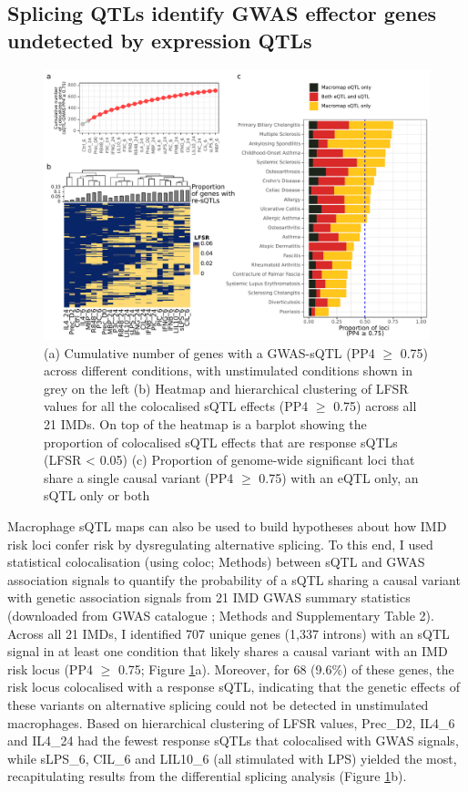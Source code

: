 \subsection{Splicing QTLs identify GWAS effector genes undetected by expression QTLs}
\begin{figure}[H]
  \centering
  \includegraphics[width=\textwidth]{coloc_sqtl}
  \caption{(a) Cumulative number of genes with a GWAS-sQTL (PP4 $\geq$ 0.75) across different conditions, with unstimulated conditions shown in grey on the left (b) Heatmap and hierarchical clustering of LFSR values for all the colocalised sQTL effects (PP4 $\geq$ 0.75) across all 21 IMDs. On top of the heatmap is a barplot showing the proportion of colocalised sQTL effects that are response sQTLs (LFSR < 0.05) (c) Proportion of genome-wide significant loci that share a single causal variant (PP4 $\geq$ 0.75) with an eQTL only, an sQTL only or both }
  \label{fig:coloc}   
\end{figure}
Macrophage sQTL maps can also be used to build hypotheses about how IMD risk loci confer risk by dysregulating alternative splicing. To this end, I used statistical colocalisation (using coloc; Methods) between sQTL and GWAS association signals to quantify the probability of a sQTL sharing a causal variant with genetic association signals from 21 IMD GWAS summary statistics (downloaded from GWAS catalogue \cite{Buniello2019-wb}; Methods and Supplementary Table 2). \\

Across all 21 IMDs, I identified 707 unique genes (1,337 introns) with an sQTL signal in at least one condition that likely shares a causal variant with an IMD risk locus (PP4 $\geq$ 0.75; Figure \ref{fig:coloc}a). Moreover, for 68 (9.6\%) of these genes, the risk locus colocalised with a response sQTL, indicating that the genetic effects of these variants on alternative splicing could not be detected in unstimulated macrophages. Based on hierarchical clustering of LFSR values, Prec\_D2, IL4\_6 and IL4\_24 had the fewest response sQTLs that colocalised with GWAS signals, while sLPS\_6, CIL\_6 and LIL10\_6 (all stimulated with LPS) yielded the most, recapitulating results from the differential splicing analysis (Figure \ref{fig:coloc}b). \\

